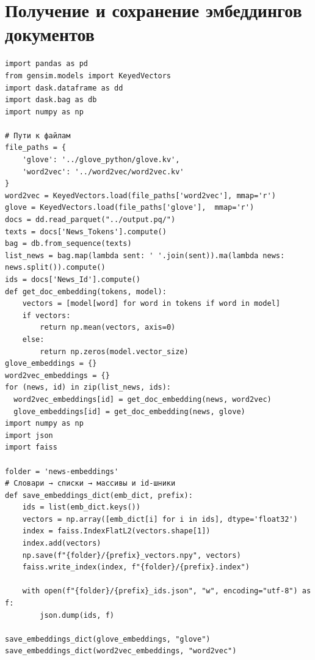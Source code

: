 \documentclass[coursework]{SCWorks}
\begin{document}
\section{Получение и сохранение эмбеддингов документов}
\label{apx:db}
\begin{verbatim}
import pandas as pd
from gensim.models import KeyedVectors
import dask.dataframe as dd
import dask.bag as db
import numpy as np

# Пути к файлам
file_paths = {
    'glove': '../glove_python/glove.kv',
    'word2vec': '../word2vec/word2vec.kv'
}
word2vec = KeyedVectors.load(file_paths['word2vec'], mmap='r')
glove = KeyedVectors.load(file_paths['glove'],  mmap='r')
docs = dd.read_parquet("../output.pq/")
texts = docs['News_Tokens'].compute()
bag = db.from_sequence(texts)
list_news = bag.map(lambda sent: ' '.join(sent)).ma(lambda news: news.split()).compute()
ids = docs['News_Id'].compute()
def get_doc_embedding(tokens, model):
    vectors = [model[word] for word in tokens if word in model]
    if vectors:
        return np.mean(vectors, axis=0)
    else:
        return np.zeros(model.vector_size)
glove_embeddings = {}
word2vec_embeddings = {}
for (news, id) in zip(list_news, ids):
  word2vec_embeddings[id] = get_doc_embedding(news, word2vec)
  glove_embeddings[id] = get_doc_embedding(news, glove)
import numpy as np
import json
import faiss

folder = 'news-embeddings'
# Словари → списки → массивы и id-шники
def save_embeddings_dict(emb_dict, prefix):
    ids = list(emb_dict.keys())
    vectors = np.array([emb_dict[i] for i in ids], dtype='float32')
    index = faiss.IndexFlatL2(vectors.shape[1])
    index.add(vectors)
    np.save(f"{folder}/{prefix}_vectors.npy", vectors)
    faiss.write_index(index, f"{folder}/{prefix}.index")

    with open(f"{folder}/{prefix}_ids.json", "w", encoding="utf-8") as f:
        json.dump(ids, f)

save_embeddings_dict(glove_embeddings, "glove")
save_embeddings_dict(word2vec_embeddings, "word2vec")
\end{verbatim}
\end{document}
